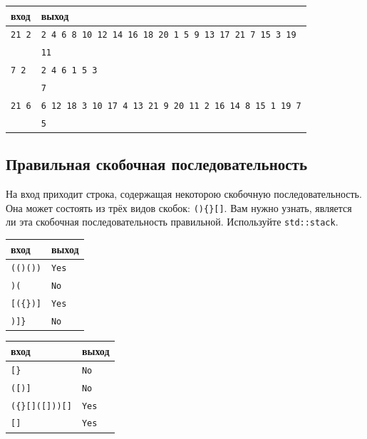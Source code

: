 \documentclass{article}
\begin{document}
\begin{center}
\begin{tabular}{ l | l }
 вход & выход \\ \hline
 \texttt{21 2} & \texttt{2 4 6 8 10 12 14 16 18 20 1 5 9 13 17 21 7 15 3 19}\\
 			   & \texttt{11} \\ \hline
 \texttt{7 2} & \texttt{2 4 6 1 5 3}\\
 			   & \texttt{7} \\ \hline
 \texttt{21 6} & \texttt{6 12 18 3 10 17 4 13 21 9 20 11 2 16 14 8 15 1 19 7}\\
 			   & \texttt{5} \\
\end{tabular}
\end{center}


\subsection{Правильная скобочная последовательность}
На вход приходит строка, содержащая некоторою скобочную последовательность. Она может состоять из трёх видов скобок: \texttt{()\{\}[]}. Вам нужно узнать, является ли эта скобочная последовательность правильной. Используйте \texttt{std::stack}.
\begin{center}
\begin{multicols}{2}
\begin{tabular}{ l | l }
 вход & выход \\ \hline
 \texttt{(()())} & \texttt{Yes}  \\ 
 \texttt{)(} &  \texttt{No}\\
 \texttt{[(\{\})]} & \texttt{Yes}  \\ 
 \texttt{)]\}} & \texttt{No}  \\ 
\end{tabular}

\begin{tabular}{ l | l }
 вход & выход \\ \hline
 \texttt{[\}} & \texttt{No}  \\ 
 \texttt{([)]} &  \texttt{No}\\
 \texttt{(\{\}[]([]))[]} & \texttt{Yes}  \\ 
 \texttt{[]} & \texttt{Yes}  \\ 
\end{tabular}
\end{multicols}
\end{center}
\end{document}
